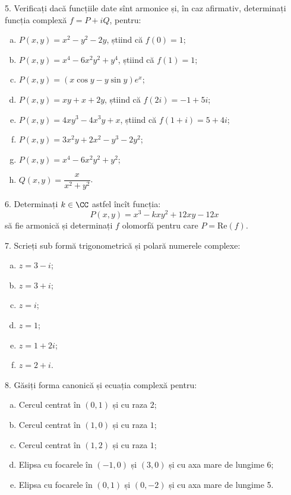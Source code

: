 \vspace{0.3cm}

5. Verificați dacă funcțiile date sînt armonice și, în caz afirmativ, determinați
funcția complexă $ f = P + iQ $, pentru:
\begin{enumerate}[(a)]
\item $ P(x, y) = x^2 - y^2 - 2y $, știind că $ f(0) = 1 $;
\item $ P(x, y) = x^4 - 6x^2y^2 + y^4 $, știind că $ f(1) = 1 $;
\item $ P(x, y) = (x \cos y - y \sin y)e^x $;
\item $ P(x, y) = xy + x + 2y $, știind că $ f(2i) = -1 + 5i $;
\item $ P(x, y) = 4xy^3 - 4x^3y + x $, știind că $ f(1 + i) = 5 + 4i $;
\item $ P(x, y) = 3x^2y + 2x^2 - y^3 - 2y^2 $;
\item $ P(x, y) = x^4 - 6x^2y^2 + y^2 $;
\item $ Q(x, y) = \dfrac{x}{x^2 + y^2} $.
\end{enumerate}

\vspace{0.3cm}

6. Determinați $ k \in \CC $ astfel încît funcția:
\[
  P(x, y) = x^3 - kxy^2 + 12xy - 12x
\]
să fie armonică și determinați $ f $ olomorfă pentru care
$ P = \mathrm{Re}(f) $.

\vspace{0.3cm}

7. Scrieți sub formă trigonometrică și polară numerele complexe:
\begin{enumerate}[(a)]
\item $ z = 3 - i $;
\item $ z = 3 + i $;
\item $ z = i $;
\item $ z = 1 $;
\item $ z = 1 + 2i $;
\item $ z = 2 + i $.
\end{enumerate}

\vspace{0.3cm}

8. Găsiți forma canonică și ecuația complexă pentru:
\begin{enumerate}[(a)]
\item Cercul centrat în $ (0, 1) $ și cu raza $ 2 $;
\item Cercul centrat în $ (1, 0) $ și cu raza $ 1 $;
\item Cercul centrat în $ (1, 2) $ și cu raza $ 1 $;
\item Elipsa cu focarele în $ (-1, 0) $ și $ (3, 0) $ și cu
  axa mare de lungime 6;
\item Elipsa cu focarele în $ (0, 1) $ și $ (0, -2) $ și
  cu axa mare de lungime 5.
\end{enumerate}

